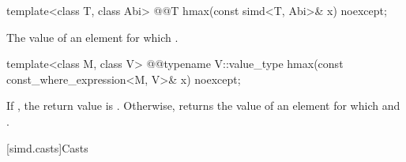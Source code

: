 \begin{itemdecl}
template<class T, class Abi> @@T hmax(const simd<T, Abi>& x) noexcept;
\end{itemdecl}

\begin{itemdescr}
  \pnum\returns
  The value of an element  for which  \foralli.
\end{itemdescr}

\begin{itemdecl}
template<class M, class V> @@typename V::value_type hmax(const const_where_expression<M, V>& x) noexcept;
\end{itemdecl}

\begin{itemdescr}
  \pnum\returns
  If , the return value is . Otherwise, returns the value of an element  for which  and  \forallmaskedi.
\end{itemdescr}

[simd.casts]{Casts}

